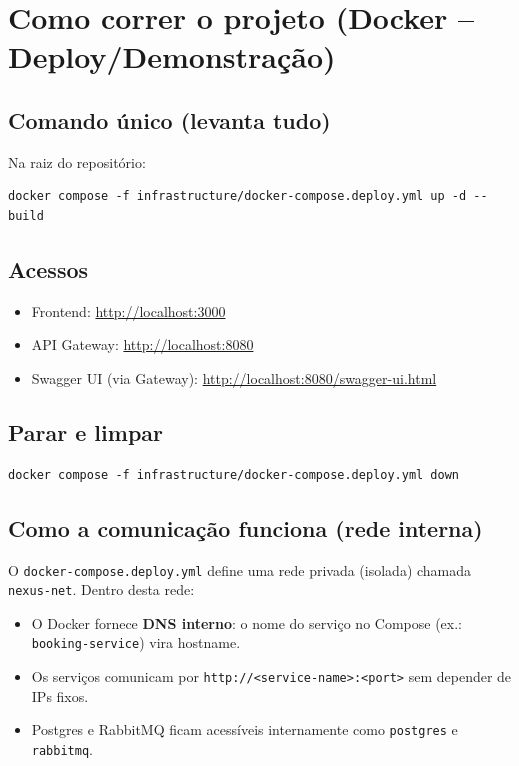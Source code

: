 \section{Como correr o projeto (Docker -- Deploy/Demonstração)}
\subsection{Comando único (levanta tudo)}
Na raiz do repositório:
\begin{verbatim}
docker compose -f infrastructure/docker-compose.deploy.yml up -d --build
\end{verbatim}

\subsection{Acessos}
\begin{itemize}[nosep]
  \item Frontend: \url{http://localhost:3000}
  \item API Gateway: \url{http://localhost:8080}
  \item Swagger UI (via Gateway): \url{http://localhost:8080/swagger-ui.html}
\end{itemize}

\subsection{Parar e limpar}
\begin{verbatim}
docker compose -f infrastructure/docker-compose.deploy.yml down
\end{verbatim}

\subsection{Como a comunicação funciona (rede interna)}
O \texttt{docker-compose.deploy.yml} define uma rede privada (isolada) chamada \texttt{nexus-net}. Dentro desta rede:
\begin{itemize}[nosep]
  \item O Docker fornece \textbf{DNS interno}: o nome do serviço no Compose (ex.: \texttt{booking-service}) vira hostname.
  \item Os serviços comunicam por \texttt{http://<service-name>:<port>} sem depender de IPs fixos.
  \item Postgres e RabbitMQ ficam acessíveis internamente como \texttt{postgres} e \texttt{rabbitmq}.
\end{itemize}

